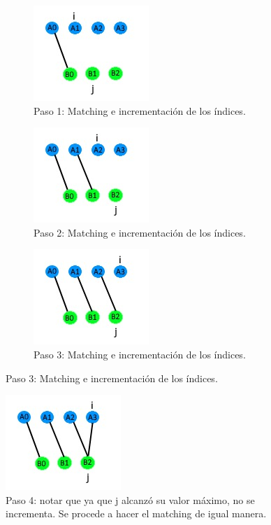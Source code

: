 \documentclass{article}
\begin{document}
\begin{figure}

    \centering
    
    \begin{subfigure}[b]{1\textwidth}
    \centering
    \includegraphics[]{ada2.jpeg}
    \caption{Paso 1: Matching e incrementación de los índices.}
    \label{fig:sub1}
    \end{subfigure}
    
    \begin{subfigure}[b]{1\textwidth}
    \centering
    \includegraphics[]{ada3.jpeg}
    \caption{Paso 2: Matching e incrementación de los índices.}
    \label{fig:sub2}
    \end{subfigure}
    
    \begin{subfigure}[b]{1\textwidth}
    \centering
    \includegraphics[]{ada4.jpeg}
    \caption{Paso 3: Matching e incrementación de los índices.}
    \label{fig:sub3}
    \end{subfigure}
    
\end{figure}
\begin{figure}

    \centering
    \includegraphics[]{ada5.jpeg}
    \caption{Paso 4: notar que ya que j alcanzó su valor máximo, no se incrementa. Se procede a hacer el matching de igual manera.}
    \label{fig:sub4}

\end{figure}
\end{document}
